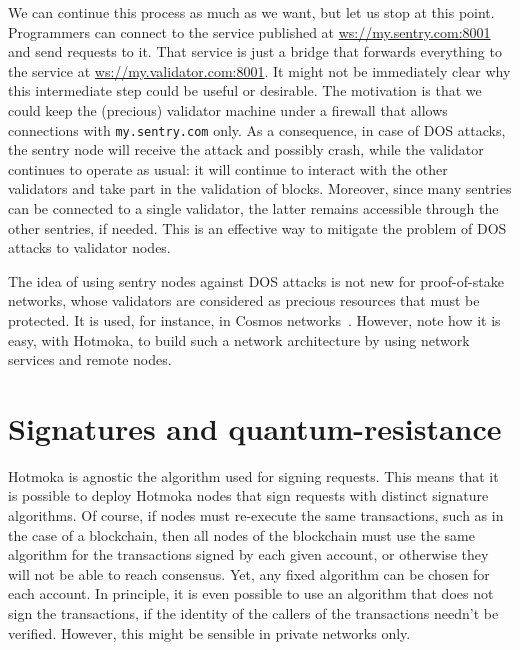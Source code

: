 We can continue this process as much as we want, but let us stop at this point.
Programmers can connect to the service published at
\url{ws://my.sentry.com:8001} and send requests to it. That service is just a bridge
that forwards everything to the service at \url{ws://my.validator.com:8001}.
It might not be immediately clear why this intermediate step could be useful
or desirable. The motivation is that we could keep the (precious) validator
machine under a firewall that allows connections with \texttt{my.sentry.com} only.
As a consequence, in case of DOS attacks, the sentry node will receive
the attack and possibly crash, while the validator continues to operate as usual:
it will continue to interact with the other validators and take part in the validation
of blocks. Moreover, since many sentries can be connected to a single validator, the latter
remains accessible through the other sentries, if needed.
This is an effective way to mitigate the problem of DOS attacks to validator nodes.

The idea of using sentry nodes against DOS attacks is not new for proof-of-stake networks,
whose validators are considered as precious resources that must be protected. It is used, for
instance, in Cosmos networks~\cite{CosmosSentry}.
However, note how it is easy, with Hotmoka, to build such a network architecture
by using network services and remote nodes.

\section{Signatures and quantum-resistance}\label{sec:quantum}

Hotmoka is agnostic \wrt{} the algorithm used for signing requests. This means that it is
possible to deploy Hotmoka nodes that sign requests with distinct signature algorithms.
Of course, if nodes must re-execute the same transactions, such as in the case of a
blockchain, then all nodes of the blockchain must use the same algorithm for
the transactions signed by each given account, or otherwise
they will not be able to reach consensus.
Yet, any fixed algorithm can be chosen for each account. In principle, it is even possible to use
an algorithm that does not sign the transactions, if the identity of the callers of the
transactions needn't be verified. However, this might be sensible in private networks only.

